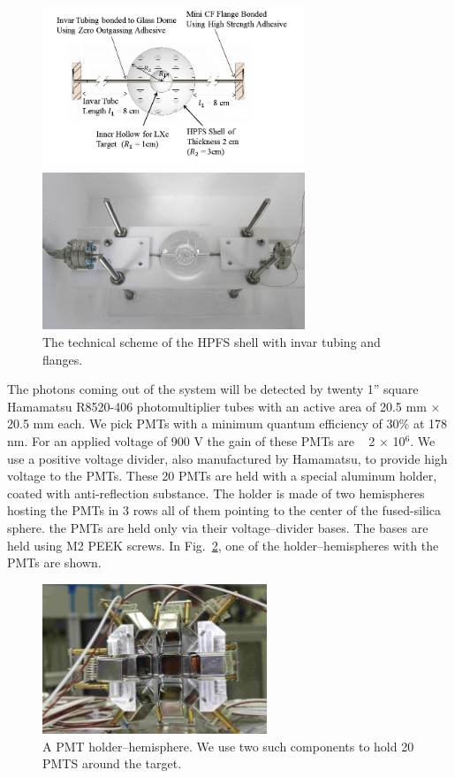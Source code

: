 \begin{figure}
   \centering
   \includegraphics[width=0.7\textwidth]{spheredesign1.png}
   
   \vspace{0.2cm}
   \includegraphics[width=0.7\textwidth]{spherephoto.png}
   \caption{The technical scheme of the HPFS shell with invar tubing and flanges.} 
   \label{fig:sphere}
\end{figure}


The photons coming out of the system will be detected by twenty 1'' square Hamamatsu R8520-406 photomultiplier 
tubes with an active area of 20.5 mm $\times$ 20.5 mm each. We pick PMTs with a minimum quantum efficiency of 30\% 
at 178 nm. For an applied voltage of 900 V the gain of these PMTs are ~ 2 $\times$ 10$^6$. We use a positive 
voltage divider, also manufactured by Hamamatsu, to provide high voltage to the PMTs.
These 20 PMTs are held with a special aluminum holder, coated with anti-reflection substance. The holder is made of two hemispheres hosting the PMTs in 
3 rows all of them pointing to the center of the fused-silica sphere. the PMTs are held only via their voltage--divider bases. 
The bases are held using M2 PEEK screws. 
In Fig.~\ref{fig:pmtholder}, one of the holder--hemispheres with the PMTs are shown.

\begin{figure}
   \centering
   \includegraphics[width=0.6\textwidth]{PMTholder.JPG}
   \caption{A PMT holder--hemisphere. We use two such components to hold 20 PMTS around the target.} 
   \label{fig:pmtholder}
\end{figure}


